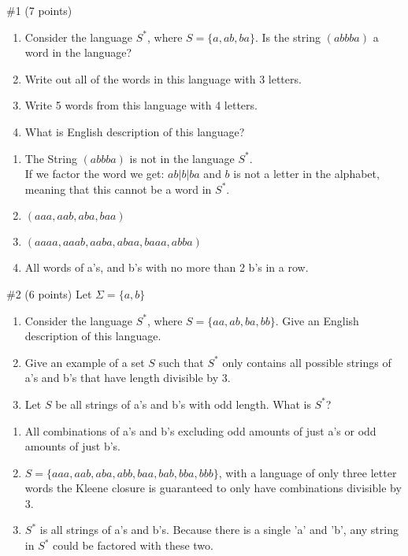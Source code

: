 \begin{problem}{\#1 (7 points)}
    \begin{enumerate}[label=\alph*)]
        \item Consider the language \(S^*\), where \(S = \{a,ab,ba\}\). Is the string \((abbba)\) a word in the language?
        \item Write out all of the words in this language with 3 letters.
        \item Write 5 words from this language with 4 letters.
        \item What is English description of this language?
    \end{enumerate}
\end{problem}
\vspace{2em}
\begin{solution}
    \begin{enumerate}[label=\alph*)]
        \item The String \((abbba)\) is not in the language \(S^*\).\\
        If we factor the word we get: \(ab|b|ba\) and \(b\) is not a letter in the alphabet, meaning that this cannot be a word in \(S^*\).
        \item \((aaa, aab, aba, baa)\)
        \item \((aaaa, aaab,aaba,abaa,baaa,abba)\)
        \item All words of a's, and b's with no more than 2 b's in a row. 
    \end{enumerate}
\end{solution}

\begin{problem}{\#2 (6 points)}
    Let \(\Sigma = \{a,b\}\)
    \begin{enumerate}[label=\alph*)]
        \item Consider the language \(S^*\), where \(S=\{aa,ab,ba,bb\}\).
        Give an English description of this language.
        \item Give an example of a set \(S\) such that \(S^*\) only contains all possible strings of a's and b's that have length divisible by 3.
        \item Let \(S\) be all strings of a's and b's with odd length.
        What is \(S^*\)?
    \end{enumerate}
\end{problem}
\vspace{2em}
\begin{solution}
    \begin{enumerate}[label=\alph*)]
        \item All combinations of a's and b's excluding odd amounts of just a's or odd amounts of just b's.
        \item \(S=\{aaa,aab,aba,abb,baa,bab,bba,bbb\}\), with a language of only three letter words the Kleene closure is guaranteed to only have combinations divisible by 3.
        \item \(S^*\) is all strings of a's and b's.
        Because there is a single 'a' and 'b', any string in \(S^*\) could be factored with these two. 
    \end{enumerate}
\end{solution}


